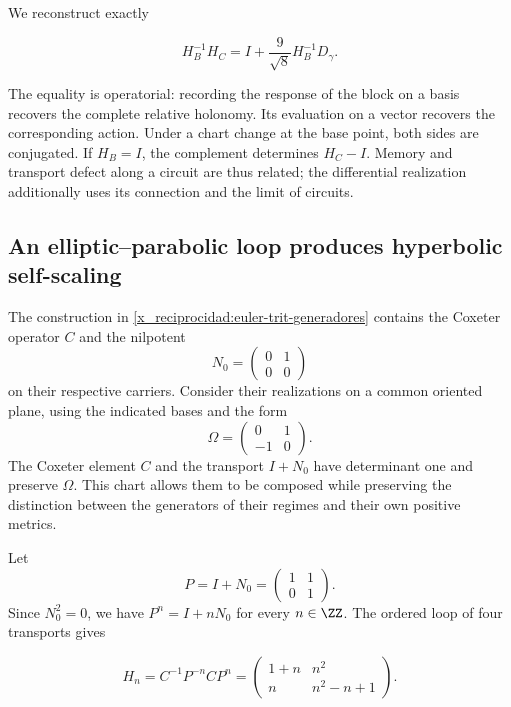 We reconstruct exactly



\begin{equation}
\boxed{H_B^{-1}H_C=I+\frac9{\sqrt8}H_B^{-1}D_\gamma.}
\label{x_reciprocidad:nuc11:eq:25}
\end{equation}



The equality is operatorial: recording the response of the block
on a basis recovers the complete relative holonomy.
Its evaluation on a vector recovers the corresponding action.
Under a chart change at the base point, both sides are conjugated.
If \(H_B=I\), the complement determines \(H_C-I\).
Memory and transport defect along a circuit are thus
related; the differential realization additionally uses
its connection and the limit of circuits.

\subsection{An elliptic–parabolic loop produces hyperbolic self-scaling}

The construction in \cref{x_reciprocidad:euler-trit-generadores} contains the Coxeter operator \(C\) and the nilpotent
\[
 N_0=\begin{pmatrix}0&1\\0&0\end{pmatrix}
\]
on their respective carriers. Consider their realizations on a common oriented plane, using the indicated bases and the form
\[
 \Omega=\begin{pmatrix}0&1\\-1&0\end{pmatrix}.
\]
The Coxeter element \(C\) and the transport \(I+N_0\) have determinant
one and preserve \(\Omega\).
This chart allows them to be composed while preserving the distinction between
the generators of their regimes and their own positive metrics.

Let
\[
 P=I+N_0=\begin{pmatrix}1&1\\0&1\end{pmatrix}.
\]
Since \(N_0^2=0\), we have \(P^n=I+nN_0\) for every
\(n\in\ZZ\).
The ordered loop of four transports gives



\begin{equation}
H_n=C^{-1}P^{-n}CP^n
=\begin{pmatrix}1+n&n^2\\n&n^2-n+1\end{pmatrix}.
\label{x_reciprocidad:nuc11:eq:28}
\end{equation}



